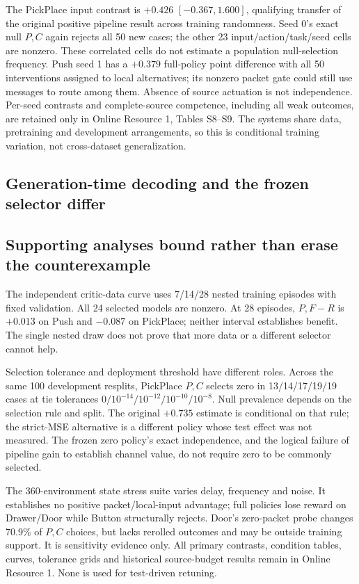 The PickPlace input contrast is $+0.426$ $[-0.367,1.600]$, qualifying transfer of the original positive pipeline result across training randomness. Seed 0's exact null $P,C$ again rejects all 50 new cases; the other 23 input/action/task/seed cells are nonzero. These correlated cells do not estimate a population null-selection frequency. Push seed 1 has a $+0.379$ full-policy point difference with all 50 interventions assigned to local alternatives; its nonzero packet gate could still use messages to route among them. Absence of source actuation is not independence. Per-seed contrasts and complete-source competence, including all weak outcomes, are retained only in Online Resource 1, Tables S8--S9. The systems share data, pretraining and development arrangements, so this is conditional training variation, not cross-dataset generalization.

\subsection{Generation-time decoding and the frozen selector differ}\label{sec:decoderresults}

\subsection{Supporting analyses bound rather than erase the counterexample}\label{sec:toleranceresults}
The independent critic-data curve uses 7/14/28 nested training episodes with fixed validation. All 24 selected models are nonzero. At 28 episodes, $P,F-R$ is $+0.013$ on Push and $-0.087$ on PickPlace; neither interval establishes benefit. The single nested draw does not prove that more data or a different selector cannot help.

Selection tolerance and deployment threshold have different roles. Across the same 100 development resplits, PickPlace $P,C$ selects zero in 13/14/17/19/19 cases at tie tolerances $0/10^{-14}/10^{-12}/10^{-10}/10^{-8}$. Null prevalence depends on the selection rule and split. The original $+0.735$ estimate is conditional on that rule; the strict-MSE alternative is a different policy whose test effect was not measured. The frozen zero policy's exact independence, and the logical failure of pipeline gain to establish channel value, do not require zero to be commonly selected.

The 360-environment state stress suite varies delay, frequency and noise. It establishes no positive packet/local-input advantage; full policies lose reward on Drawer/Door while Button structurally rejects. Door's zero-packet probe changes 70.9\% of $P,C$ choices, but lacks rerolled outcomes and may be outside training support. It is sensitivity evidence only. All primary contrasts, condition tables, curves, tolerance grids and historical source-budget results remain in Online Resource 1. None is used for test-driven retuning.
